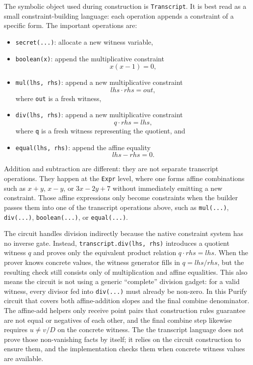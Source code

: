 \documentclass[11pt]{article}
\begin{document}
The symbolic object used during construction is \texttt{Transcript}. It is best read as a small
constraint-building language: each operation appends a constraint of a specific form. The important
operations are:
\begin{itemize}[nosep]
  \item \texttt{secret(...)}: allocate a new witness variable,
  \item \texttt{boolean(x)}: append the multiplicative constraint
  \[
  x(x-1)=0,
  \]
  \item \texttt{mul(lhs, rhs)}: append a new multiplicative constraint
  \[
  lhs \cdot rhs = out,
  \]
  where \texttt{out} is a fresh witness,
  \item \texttt{div(lhs, rhs)}: append a new multiplicative constraint
  \[
  q \cdot rhs = lhs,
  \]
  where \texttt{q} is a fresh witness representing the quotient, and
  \item \texttt{equal(lhs, rhs)}: append the affine equality
  \[
  lhs-rhs=0.
  \]
\end{itemize}

Addition and subtraction are different: they are not separate transcript operations. They happen at
the \texttt{Expr} level, where one forms affine combinations such as $x+y$, $x-y$, or
$3x-2y+7$ without immediately emitting a new constraint. Those affine expressions only become
constraints when the builder passes them into one of the transcript operations above, such as
\texttt{mul(...)}, \texttt{div(...)}, \texttt{boolean(...)}, or \texttt{equal(...)}.

The circuit handles division indirectly because the native constraint system has no inverse gate. Instead,
\texttt{transcript.div(lhs, rhs)} introduces a quotient witness $q$ and proves only the equivalent
product relation $q \cdot rhs = lhs$. When the prover knows concrete values, the witness generator
fills in $q = lhs/rhs$, but the resulting check still consists only of multiplication and affine
equalities. This also means the circuit is not using a generic ``complete'' division gadget: for a
valid witness, every divisor fed into \texttt{div(...)} must already be non-zero. In this Purify
circuit that covers both affine-addition slopes and the final combine denominator. The affine-add
helpers only receive point pairs that construction rules guarantee are not equal or negatives of
each other, and the final combine step likewise requires $u \neq v/D$ on the concrete witness. The
the transcript language does not prove those non-vanishing facts by itself; it relies on the circuit
construction to ensure them, and the implementation checks them when concrete witness values are
available.
\end{document}
